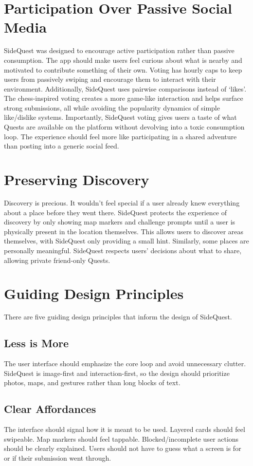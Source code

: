 \documentclass[12pt,a4paper,oneside]{report}
\begin{document}
\section{Participation Over Passive Social Media}
SideQuest was designed to encourage active participation rather than passive consumption. The app should make users feel curious about what is nearby and motivated to contribute something of their own. Voting has hourly caps to keep users from passively swiping and encourage them to interact with their environment. Additionally, SideQuest uses pairwise comparisons instead of `likes'. The chess-inspired voting creates a more game-like interaction and helps surface strong submissions, all while avoiding the popularity dynamics of simple like/dislike systems. Importantly, SideQuest voting gives users a taste of what Quests are available on the platform without devolving into a toxic consumption loop. The experience should feel more like participating in a shared adventure than posting into a generic social feed.

\section{Preserving Discovery}
Discovery is precious. It wouldn't feel special if a user already knew everything about a place before they went there. SideQuest protects the experience of discovery by only showing map markers and challenge prompts until a user is physically present in the location themselves. This allows users to discover areas themselves, with SideQuest only providing a small hint. Similarly, some places are personally meaningful. SideQuest respects users' decisions about what to share, allowing private friend-only Quests.

\section{Guiding Design Principles}
There are five guiding design principles that inform the design of SideQuest.

\subsection{Less is More}
The user interface should emphasize the core loop and avoid unnecessary clutter. SideQuest is image-first and interaction-first, so the design should prioritize photos, maps, and gestures rather than long blocks of text.

\subsection{Clear Affordances}
The interface should signal how it is meant to be used. Layered cards should feel swipeable. Map markers should feel tappable. Blocked/incomplete user actions should be clearly explained. Users should not have to guess what a screen is for or if their submission went through. 
\end{document}

